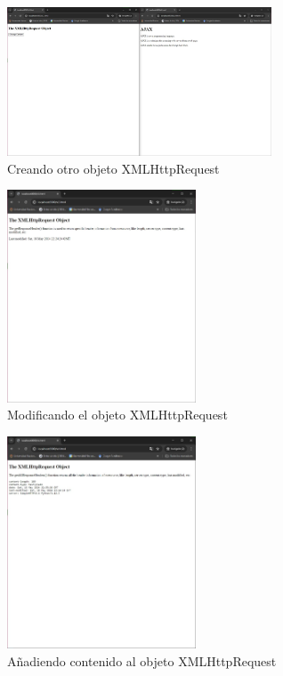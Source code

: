 \begin{figure}[H]
  \centering
  \includegraphics[width=0.7\textwidth]{img/ex2.jpg}
  \caption{Creando otro objeto XMLHttpRequest}
  \end{figure}
\begin{figure}[H]
    \centering
    \includegraphics[width=0.5\textwidth]{img/ex3.jpg}
    \caption{Modificando el objeto XMLHttpRequest}
    \end{figure}
\begin{figure}[H]
    \centering
    \includegraphics[width=0.5\textwidth]{img/ex4.jpg}
    \caption{Añadiendo contenido al objeto XMLHttpRequest}
    \end{figure}

